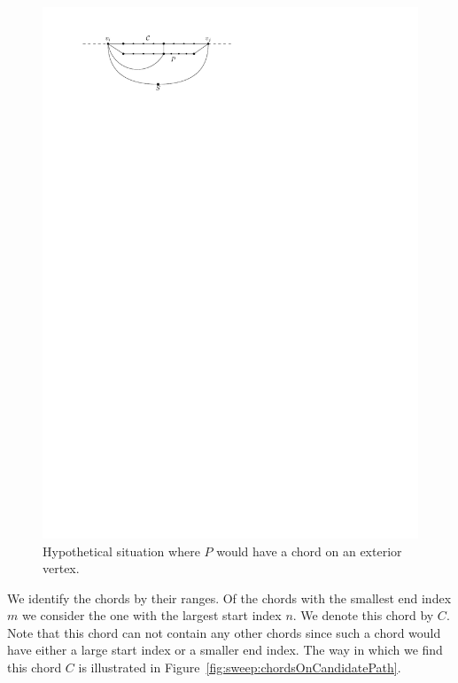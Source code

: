     \begin{figure}[b]
      \centering
      \includegraphics[scale=1]{unifiedAlgo/img/sweep/noChordOnExtriorVertex.pdf}
      \caption{Hypothetical situation where $P$ would have a chord on an exterior vertex.}
      \label{fig:sweep:noChordOnExteriorVertex}
    \end{figure}

    We identify the chords by their ranges. Of the chords with the smallest end index $m$ we consider the one with the largest start index $n$. We denote this chord by $C$.
    Note that this chord can not contain any other chords since such a chord would have either a large start index or a smaller end index.
    The way in which we find this chord $C$ is illustrated in Figure~\ref{fig:sweep:chordsOnCandidatePath}.

